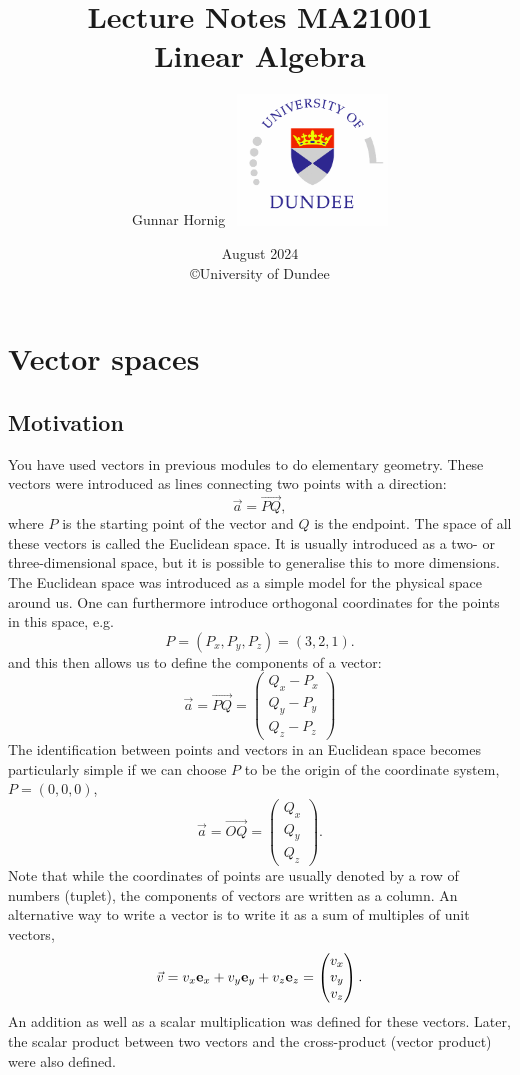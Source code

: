 \documentclass[
  letterpaper,
  DIV=11,
  numbers=noendperiod]{scrartcl}
\title{Lecture Notes MA21001\\
Linear Algebra}
\author{Gunnar Hornig
~\includegraphics[width=4cm,height=\textheight,keepaspectratio]{dundee-logo.png}}
\date{August 2024\\
©University of Dundee}
\theoremstyle{remark}
\begin{document}
\maketitle


\DeclareOldFontCommand{\bf}{\normalfont\bfseries}{\mathbf}

\section{Vector spaces}\label{vector-spaces}

\subsection{Motivation}\label{motivation}

You have used vectors in previous modules to do elementary geometry.
These vectors were introduced as lines connecting two points with a
direction: \[{\vec a} = \overrightarrow{PQ},\] where \(P\) is the
starting point of the vector and \(Q\) is the endpoint. The space of all
these vectors is called the Euclidean space. It is usually introduced as
a two- or three-dimensional space, but it is possible to generalise this
to more dimensions. The Euclidean space was introduced as a simple model
for the physical space around us. One can furthermore introduce
orthogonal coordinates for the points in this space, e.g.
\[P =  (P_x,P_y,P_z) = (3,2,1).\] and this then allows us to define the
components of a vector:
\[{\vec a} = \overrightarrow{PQ} =  \begin{pmatrix}    Q_x- P_x \\ Q_y- P_y \\ Q_z -P_z  \end{pmatrix} \]
The identification between points and vectors in an Euclidean space
becomes particularly simple if we can choose \(P\) to be the origin of
the coordinate system, \(P=(0,0,0)\),
\[{\vec a} = \overrightarrow{OQ} =   \begin{pmatrix}    Q_x \\ Q_y \\ Q_z  \end{pmatrix} .\]
Note that while the coordinates of points are usually denoted by a row
of numbers (tuplet), the components of vectors are written as a column.
An alternative way to write a vector is to write it as a sum of
multiples of unit vectors,
\[{\vec v} =   v_x {\bf e}_x + v_y {\bf e}_y + v_z {\bf e}_z  =  \begin{pmatrix}    v_x \\ v_y \\ v_z  \end{pmatrix}.\]
An addition as well as a scalar multiplication was defined for these
vectors. Later, the scalar product between two vectors and the
cross-product (vector product) were also defined.
\end{document}
